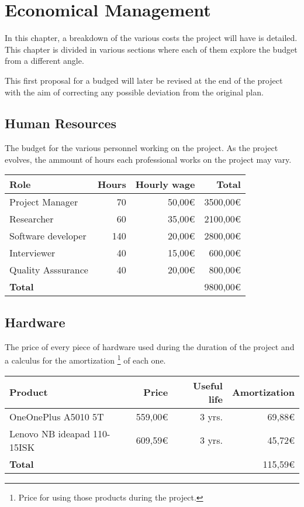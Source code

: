 \section{Economical Management}\label{economical}

In this chapter, a breakdown of the various costs the project will have is detailed. This chapter is divided in various sections where each of them explore the budget from a different angle.

This first proposal for a budged will later be revised at the end of the project with the aim of correcting any possible deviation from the original plan.

\subsection{Human Resources}

The budget for the various personnel working on the project. As the project evolves, the ammount of hours each professional works on the project may vary.

\begin{center}
    \begin{tabular}{ | l | r | r | r | }
        \hline
        \textbf{Role} & \textbf{Hours} & \textbf{Hourly wage} & \textbf{Total} \\ 
        \hline
        \hline
        Project Manager & 70 & 50,00€ & 3500,00€ \\  
        Researcher & 60 & 35,00€ & 2100,00€ \\
        Software developer & 140 & 20,00€ & 2800,00€ \\
        Interviewer & 40 & 15,00€ & 600,00€ \\
        Quality Asssurance & 40 & 20,00€ & 800,00€ \\
        \hline
        \textbf{Total} &  &  & 9800,00€ \\      
        \hline
    \end{tabular}
\end{center}

\subsection{Hardware}

The price of every piece of hardware used during the duration of the project and a calculus for the amortization
\footnote{Price for using those products during the project.}
of each one.

\begin{center}
    \begin{tabular}{ | l | r | r | r | }
        \hline
        \textbf{Product} & \textbf{Price} &
        \textbf{Useful life} & \textbf{Amortization} \\ 
        \hline
        \hline
        OneOnePlus A5010 5T & 559,00€ & 3 yrs. & 69,88€ \\  
        Lenovo NB ideapad 110-15ISK & 609,59€ & 3 yrs. & 45,72€ \\ 
        \hline
        \textbf{Total} & & & 115,59€ \\      
        \hline
    \end{tabular}
\end{center}

